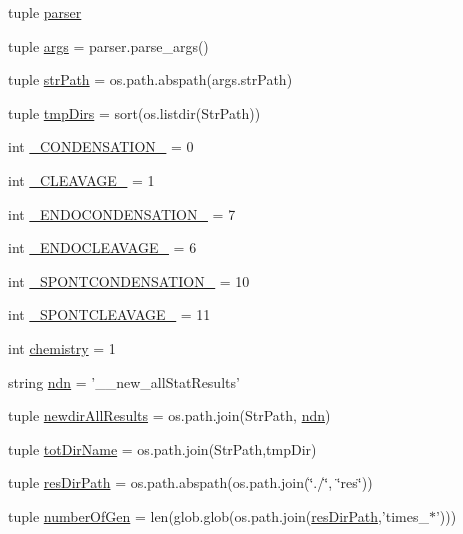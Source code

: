 \begin{DoxyCompactItemize}
\item 
tuple \hyperlink{a00092_adba84e3872cb47cad219837458e56677}{parser}
\item 
tuple \hyperlink{a00092_afa2d0b9fb021746e05cd06277997da04}{args} = parser.\-parse\-\_\-args()
\item 
tuple \hyperlink{a00092_a8932cabcf73065a531104c53a324508a}{str\-Path} = os.\-path.\-abspath(args.\-str\-Path)
\item 
tuple \hyperlink{a00092_af740eb0100dc7010628161baeaf9b474}{tmp\-Dirs} = sort(os.\-listdir(Str\-Path))
\item 
int \hyperlink{a00092_aad87b9d241bea71df95c318686aca066}{\-\_\-\-C\-O\-N\-D\-E\-N\-S\-A\-T\-I\-O\-N\-\_\-} = 0
\item 
int \hyperlink{a00092_af81d6d0377f4d99177961a5604f58ed2}{\-\_\-\-C\-L\-E\-A\-V\-A\-G\-E\-\_\-} = 1
\item 
int \hyperlink{a00092_a0637697acae236afe5e5ae8dc1d85431}{\-\_\-\-E\-N\-D\-O\-C\-O\-N\-D\-E\-N\-S\-A\-T\-I\-O\-N\-\_\-} = 7
\item 
int \hyperlink{a00092_a4535f1f4043aef3195766733626b61e4}{\-\_\-\-E\-N\-D\-O\-C\-L\-E\-A\-V\-A\-G\-E\-\_\-} = 6
\item 
int \hyperlink{a00092_a33ff8ddc4a26ccd45029e2b369391aba}{\-\_\-\-S\-P\-O\-N\-T\-C\-O\-N\-D\-E\-N\-S\-A\-T\-I\-O\-N\-\_\-} = 10
\item 
int \hyperlink{a00092_a485cf1077a4ece847800617ede00e458}{\-\_\-\-S\-P\-O\-N\-T\-C\-L\-E\-A\-V\-A\-G\-E\-\_\-} = 11
\item 
int \hyperlink{a00092_ab4fd705796fd835a4238fecdc3caf76e}{chemistry} = 1
\item 
string \hyperlink{a00092_a5df7e71a36351afd3e59d6f50a94bdaf}{ndn} = '\-\_\-\_\-new\-\_\-all\-Stat\-Results'
\item 
tuple \hyperlink{a00092_ae53bd92b0509a8f35e92e734a7f4b4e1}{newdir\-All\-Results} = os.\-path.\-join(Str\-Path, \hyperlink{a00092_a5df7e71a36351afd3e59d6f50a94bdaf}{ndn})
\item 
tuple \hyperlink{a00092_a7883e37b9556e49968e7a7dd08893bfb}{tot\-Dir\-Name} = os.\-path.\-join(Str\-Path,tmp\-Dir)
\item 
tuple \hyperlink{a00092_abc625ab1aeed5741a02bbaccfbee5c06}{res\-Dir\-Path} = os.\-path.\-abspath(os.\-path.\-join(\char`\"{}./\char`\"{}, \char`\"{}res\char`\"{}))
\item 
tuple \hyperlink{a00092_acd3059fa3a61438f739193dc80f23b80}{number\-Of\-Gen} = len(glob.\-glob(os.\-path.\-join(\hyperlink{a00092_abc625ab1aeed5741a02bbaccfbee5c06}{res\-Dir\-Path},'times\-\_\-$\ast$')))

\end{DoxyCompactItemize}
